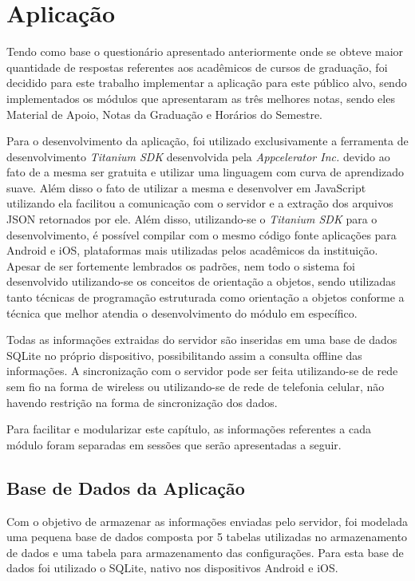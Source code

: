 \chapter{Aplicação}

Tendo como base o questionário apresentado anteriormente onde se obteve maior quantidade de respostas referentes aos acadêmicos de cursos de graduação, foi decidido para este trabalho implementar a aplicação para este público alvo, sendo implementados os módulos que apresentaram as três melhores notas, sendo eles Material de Apoio, Notas da Graduação e Horários do Semestre.

Para o desenvolvimento da aplicação, foi utilizado exclusivamente a ferramenta de desenvolvimento \emph{Titanium SDK} desenvolvida pela \emph{Appcelerator Inc.} devido ao fato de a mesma ser gratuita e utilizar uma linguagem com curva de aprendizado suave. Além disso o fato de utilizar a mesma e desenvolver em JavaScript utilizando ela facilitou a comunicação com o servidor e a extração dos arquivos JSON retornados por ele. Além disso, utilizando-se o \emph{Titanium SDK} para o desenvolvimento, é possível compilar com o mesmo código fonte aplicações para Android e iOS, plataformas mais utilizadas pelos acadêmicos da instituição. Apesar de ser fortemente lembrados os padrões, nem todo o sistema foi desenvolvido utilizando-se os conceitos de orientação a objetos, sendo utilizadas tanto técnicas de programação estruturada como orientação a objetos conforme a técnica que melhor atendia o desenvolvimento do módulo em específico.

Todas as informações extraidas do servidor são inseridas em uma base de dados SQLite no próprio dispositivo, possibilitando assim a consulta offline das informações. A sincronização com o servidor pode ser feita utilizando-se de rede sem fio na forma de wireless ou utilizando-se de rede de telefonia celular, não havendo restrição na forma de sincronização dos dados.

Para facilitar e modularizar este capítulo, as informações referentes a cada módulo foram separadas em sessões que serão apresentadas a seguir.

\section{Base de Dados da Aplicação}

Com o objetivo de armazenar as informações enviadas pelo servidor, foi modelada uma pequena base de dados composta por 5 tabelas utilizadas no armazenamento de dados e uma tabela para armazenamento das configurações. Para esta base de dados foi utilizado o SQLite, nativo nos dispositivos Android e iOS.

